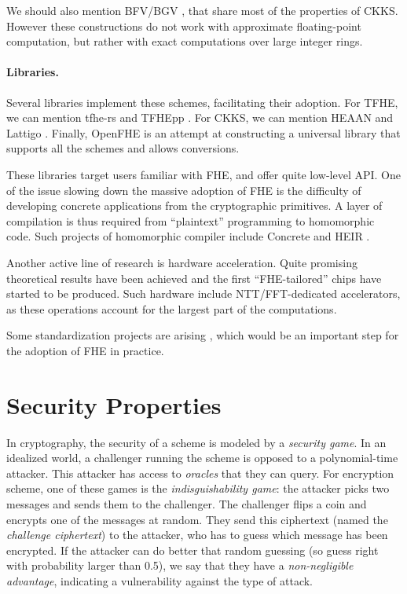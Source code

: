 We should also mention BFV/BGV \cite{C:Brakerski12, bgv, EPRINT:FanVer12}, that share most of the properties of CKKS. However these constructions do not work with approximate floating-point computation, but rather with exact computations over large integer rings.


\paragraph{Libraries.}
Several libraries implement these schemes, facilitating their adoption. For \gls{TFHE}, we can mention tfhe-rs \cite{tfhe-rs}  and TFHEpp \cite{TFHEpp}. For CKKS, we can mention HEAAN \cite{heaan} and Lattigo \cite{lattigo}. Finally, OpenFHE \cite{OpenFHE} is an attempt at constructing a universal library that supports all the schemes and allows conversions.


These libraries target users familiar with \gls{FHE}, and offer quite low-level API. One of the issue slowing down the massive adoption of \gls{FHE} is the difficulty of developing concrete applications from the cryptographic primitives. A layer of compilation is thus required from ``plaintext'' programming to homomorphic code. Such projects of homomorphic compiler include Concrete \cite{Concrete} and HEIR \cite{HEIR}.

\medskip
Another active line of research is hardware acceleration. Quite promising theoretical results have been achieved \cite{TCHES:GVPHMS23, EPRINT:BBTV23a, EPRINT:CPBFSJ23, EPRINT:KHMR24} and the first ``\gls{FHE}-tailored'' chips have started to be produced. Such hardware include \gls{NTT}/\gls{FFT}-dedicated accelerators, as these operations account for the largest part of the computations. 


Some standardization projects are arising \cite{HomomorphicEncryptionSecurityStandard, call_nist}, which would be an important step for the adoption of \gls{FHE} in practice.
 	


\section{Security Properties}


In cryptography, the security of a scheme is modeled by a \textit{security game}. In an idealized world, a challenger running the scheme is opposed to a polynomial-time attacker. This attacker has access to \textit{oracles} that they can query. For encryption scheme, one of these games is the \textit{indisguishability game}: the attacker picks two messages and sends them to the challenger. The challenger flips a coin and encrypts one of the messages at random. They send this ciphertext (named the \textit{challenge ciphertext}) to the attacker, who has to guess which message has been encrypted. If the attacker can do better that random guessing (so guess right with probability larger than 0.5), we say that they have a \textit{non-negligible advantage}, indicating a vulnerability against the type of attack.

